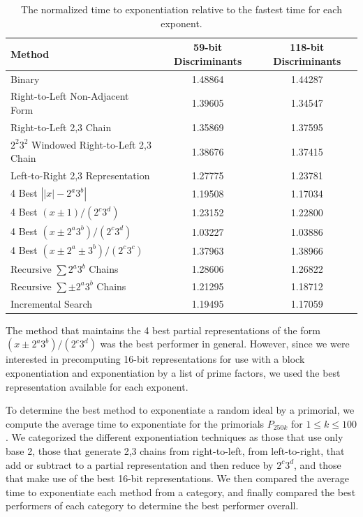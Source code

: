 \documentclass{ucalgthes1}
\theoremstyle{definition}
\begin{document}
\begin{table}[h]
\centering
\begin{tabular}{| l | c | c |}
	\hline
	Method & 59-bit Discriminants & 118-bit Discriminants \\
	\hline
	Binary & 1.48864 & 1.44287 \\
	Right-to-Left Non-Adjacent Form & 1.39605 & 1.34547 \\
	Right-to-Left 2,3 Chain & 1.35869 & 1.37595 \\
	$2^2 3^2$ Windowed Right-to-Left 2,3 Chain & 1.38676 & 1.37415 \\
	Left-to-Right 2,3 Representation & 1.27775 & 1.23781 \\
	4 Best $\left||x|-2^a3^b\right|$ & 1.19508 & 1.17034 \\
	4 Best $(x \pm 1)/(2^c3^d)$ & 1.23152 & 1.22800 \\
	4 Best $(x \pm 2^a3^b)/(2^c3^d)$ & 1.03227 & 1.03886 \\
	4 Best $(x \pm 2^a \pm 3^b)/(2^c3^c)$ & 1.37963 & 1.38966 \\
	Recursive $\sum 2^a3^b$ Chains & 1.28606 & 1.26822 \\
	Recursive $\sum \pm 2^a3^b$ Chains & 1.21295 & 1.18712 \\
	Incremental Search & 1.19495 & 1.17059 \\
	\hline
\end{tabular}
\caption{The normalized time to exponentiation relative to the fastest time for each exponent.}
\label{tab:exp16bitTimes}
\end{table}
The method that maintains the 4 best partial representations of the form $(x \pm 2^a3^b)/(2^c3^d)$ was the best performer in general.  However, since we were interested in precomputing 16-bit representations for use with a block exponentiation and exponentiation by a list of prime factors, we used the best representation available for each exponent.

To determine the best method to exponentiate a random ideal by a primorial, we compute the average time to exponentiate for the primorials $P_{250k}$ for $1 \le k \le 100$.  We categorized the different exponentiation techniques as those that use only base 2, those that generate 2,3 chains from right-to-left, from left-to-right, that add or subtract to a partial representation and then reduce by $2^c3^d$, and those that make use of the best 16-bit representations.  We then compared the average time to exponentiate each method from a category, and finally compared the best performers of each category to determine the best performer overall.
\end{document}
